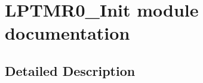 \hypertarget{group___l_p_t_m_r0___init__module}{}\section{L\+P\+T\+M\+R0\+\_\+\+Init module documentation}
\label{group___l_p_t_m_r0___init__module}


\subsection{Detailed Description}
